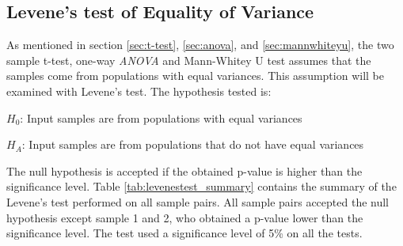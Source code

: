 \vspace{0.7cm}

\subsection{Levene's test of Equality of Variance}\label{sec:levene_test_results}
As mentioned in section \ref{sec:t-test}, \ref{sec:anova}, and \ref{sec:mannwhiteyu}, the two sample t-test, one-way \textit{ANOVA} and Mann-Whitey U test assumes that the samples come from populations with equal variances. This assumption will be examined with Levene's test. The hypothesis tested is: \\[0.3cm]

\centerline{$H_{0}$: Input samples are from populations with equal variances} 
\centerline{$H_{A}$: Input samples are from populations that do not have equal variances}
\vspace{0.3cm}

The null hypothesis is accepted if the obtained p-value is higher than the significance level. Table \ref{tab:levenestest_summary} contains the summary of the Levene's test performed on all sample pairs. All sample pairs accepted the null hypothesis except sample 1 and 2, who obtained a p-value lower than the significance level. The test used a significance level of 5\% on all the tests. \\[0.2cm]

